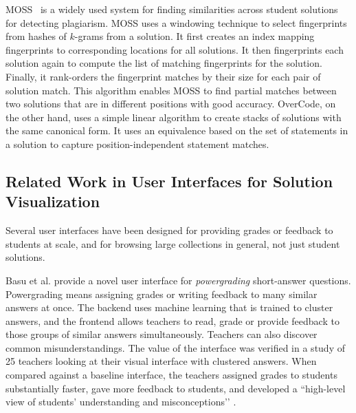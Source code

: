 MOSS~\cite{schleimer2003winnowing} is a widely used system for finding similarities across student solutions for detecting plagiarism. MOSS uses a windowing technique to select fingerprints from hashes of $k$-grams from a solution. It first creates an index mapping fingerprints to corresponding locations for all solutions. It then fingerprints each solution again to compute the list of matching fingerprints for the solution. Finally, it rank-orders the fingerprint matches by their size for each pair of solution match. This algorithm enables MOSS to find partial matches between two solutions that are in different positions with good accuracy. OverCode, on the other hand, uses a simple linear algorithm to create stacks of solutions with the same canonical form. It uses an equivalence based on the set of statements in a solution to capture position-independent statement matches.

\subsection{Related Work in User Interfaces for Solution Visualization}

Several user interfaces have been designed for providing grades or feedback to students at scale, and for browsing large collections in general, not just student solutions. 

Basu et al. \citeyear{basupowergrading} provide a novel user interface for {\it powergrading} short-answer questions. Powergrading means assigning grades or writing feedback to many similar answers at once. The backend uses machine learning that is trained to cluster answers, and the frontend allows teachers to read, grade or provide feedback to those groups of similar answers simultaneously. Teachers can also discover common misunderstandings. The value of the interface was verified in a study of 25 teachers looking at their visual interface with clustered answers. When compared against a baseline interface, the teachers assigned grades to students substantially faster, gave more feedback to students, and developed a ``high-level view of students’ understanding and misconceptions’’ \cite{basuDivideAndConquer}.


